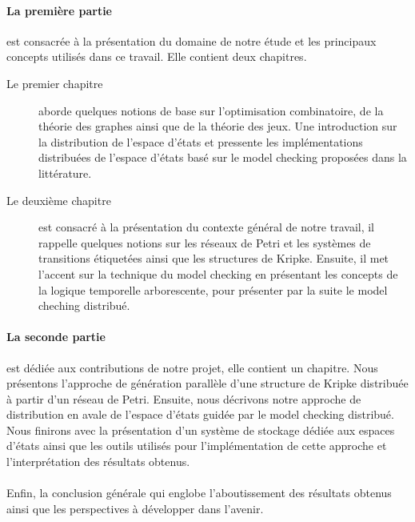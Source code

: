 \paragraph{La première partie} est consacrée à la présentation du domaine de notre étude et les
principaux concepts utilisés dans ce travail. Elle contient deux chapitres.
\begin{description}
	\item[Le premier chapitre] aborde quelques notions de base sur l’optimisation combinatoire, de la théorie des graphes ainsi que de la théorie des jeux. Une introduction sur la distribution de l'espace d'états et pressente les implémentations distribuées de l'espace d'états basé sur le model checking proposées dans la littérature.
	\item [Le deuxième chapitre ] est consacré à la présentation du contexte général de notre travail, il rappelle quelques notions sur les réseaux de Petri et les systèmes de transitions étiquetées ainsi que les structures de Kripke. Ensuite, il met l’accent sur la technique du model checking en présentant les concepts de la logique temporelle arborescente, pour présenter par la suite le model cheching distribué.
\end{description}

\paragraph{La seconde partie} est dédiée aux contributions de notre projet, elle contient un chapitre.
 Nous présentons l'approche de génération parallèle d'une structure de Kripke distribuée à partir d'un réseau de Petri. Ensuite, nous décrivons notre approche de distribution en avale de l'espace d'états guidée par le model checking distribué. Nous finirons avec la présentation d'un système de stockage dédiée aux espaces d'états ainsi que les outils utilisés pour l'implémentation de cette approche et l’interprétation des résultats obtenus.
 \\\\
 
 
Enfin, la conclusion générale qui englobe l’aboutissement des résultats obtenus  ainsi que les perspectives à développer dans l’avenir.  

